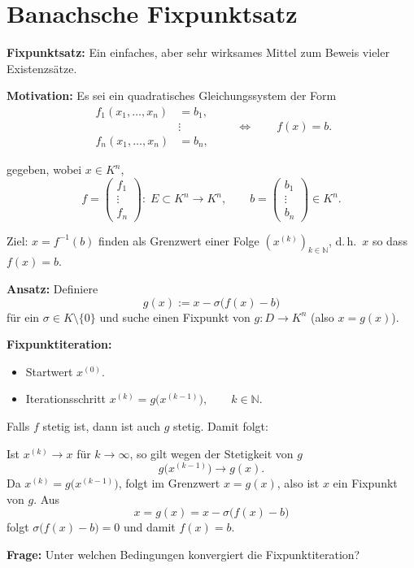 \newpage
\section{Banachsche Fixpunktsatz}
\label{3.5}

\begin{bemerkungbox}
    \textbf{Fixpunktsatz:} Ein einfaches, aber sehr wirksames Mittel zum Beweis vieler Existenzsätze.

    \textbf{Motivation:} Es sei ein quadratisches Gleichungssystem der Form
    $$
    \begin{aligned}
    f_1(x_1,\dots,x_n) &= b_1,\\
    &\vdots\\
    f_n(x_1,\dots,x_n) &= b_n,
    \end{aligned}
    \qquad\Longleftrightarrow\qquad f(x)=b.
    $$

    gegeben, wobei $x\in K^n$,
    $$
    f=\begin{pmatrix} f_1\\ \vdots\\ f_n\end{pmatrix}:\; E\subset K^n\to K^n,\qquad
    b=\begin{pmatrix} b_1\\ \vdots\\ b_n\end{pmatrix}\in K^n.
    $$

    Ziel: $x=f^{-1}(b)$ finden als Grenzwert einer Folge $(x^{(k)})_{k\in\mathbb{N}}$, d.\,h.\ $x$ so dass $f(x)=b$.

    \medskip

    \textbf{Ansatz:} Definiere
    $$
    g(x):=x-\sigma\bigl(f(x)-b\bigr)
    $$
    für ein $\sigma\in K\setminus\{0\}$ und suche einen Fixpunkt von $g:D\to K^n$ (also $x=g(x)$).

    \textbf{Fixpunktiteration:}
    \begin{itemize}
    \item Startwert $x^{(0)}$.
    \item Iterationsschritt $x^{(k)}=g\bigl(x^{(k-1)}\bigr),\qquad k\in\mathbb{N}.$
    \end{itemize}

    Falls $f$ stetig ist, dann ist auch $g$ stetig. Damit folgt:

    Ist $x^{(k)}\to x$ für $k\to\infty$, so gilt wegen der Stetigkeit von $g$
    $$
    g\bigl(x^{(k-1)}\bigr)\to g(x).
    $$
    Da $x^{(k)}=g\bigl(x^{(k-1)}\bigr)$, folgt im Grenzwert $x=g(x)$, also ist $x$ ein Fixpunkt von $g$. Aus
    $$
    x=g(x)=x-\sigma\bigl(f(x)-b\bigr)
    $$
    folgt $\sigma\bigl(f(x)-b\bigr)=0$ und damit $f(x)=b$.

    \medskip

    \textbf{Frage:} Unter welchen Bedingungen konvergiert die Fixpunktiteration?
\end{bemerkungbox}

